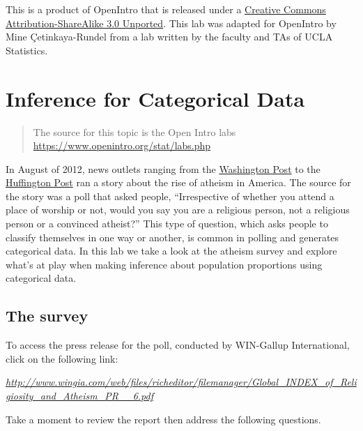 \documentclass[]{book}
\theoremstyle{definition}
\theoremstyle{definition}
\theoremstyle{remark}
\begin{document}
\hypertarget{license}{}
This is a product of OpenIntro that is released under a
\href{http://creativecommons.org/licenses/by-sa/3.0}{Creative Commons
Attribution-ShareAlike 3.0 Unported}. This lab was adapted for OpenIntro
by Mine Çetinkaya-Rundel from a lab written by the faculty and TAs of
UCLA Statistics.

\hypertarget{inference-categorical}{\chapter*{Inference for Categorical
Data}\label{inference-categorical}}

\begin{quote}
The source for this topic is the Open Intro labs
\url{https://www.openintro.org/stat/labs.php}
\end{quote}

In August of 2012, news outlets ranging from the
\href{http://www.washingtonpost.com/national/on-faith/poll-shows-atheism-on-the-rise-in-the-us/2012/08/13/90020fd6-e57d-11e1-9739-eef99c5fb285_story.html}{Washington
Post} to the
\href{http://www.huffingtonpost.com/2012/08/14/atheism-rise-religiosity-decline-in-america_n_1777031.html}{Huffington
Post} ran a story about the rise of atheism in America. The source for
the story was a poll that asked people, ``Irrespective of whether you
attend a place of worship or not, would you say you are a religious
person, not a religious person or a convinced atheist?'' This type of
question, which asks people to classify themselves in one way or
another, is common in polling and generates categorical data. In this
lab we take a look at the atheism survey and explore what's at play when
making inference about population proportions using categorical data.

\section*{The survey}\label{the-survey}

To access the press release for the poll, conducted by WIN-Gallup
International, click on the following link:

\emph{\url{http://www.wingia.com/web/files/richeditor/filemanager/Global_INDEX_of_Religiosity_and_Atheism_PR__6.pdf}}

Take a moment to review the report then address the following questions.
\end{document}
